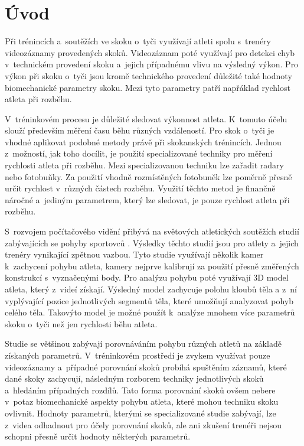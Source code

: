 \chapter*{Úvod}

Při trénincích a~soutěžích ve skoku o~tyči využívají atleti spolu s~trenéry videozáznamy provedených skoků. Videozáznam poté využívají pro detekci chyb v~technickém provedení skoku a~jejich případnému vlivu na výsledný výkon. Pro výkon při skoku o~tyči jsou kromě technického provedení důležité také hodnoty biomechanické parametry skoku. Mezi tyto parametry patří napřáklad rychlost atleta při rozběhu.

V~tréninkovém procesu je důležité sledovat výkonnost atleta. K~tomuto účelu slouží především měření času běhu různých vzdáleností. Pro skok o~tyči je vhodné aplikovat podobné metody právě při skokanských trénincích. Jednou z~možností, jak toho docílit, je použití specializované techniky pro měření rychlosti atleta při rozběhu. Mezi specializovanou techniku lze zařadit radary nebo fotobuňky. Za použití vhodně rozmístěných fotobuněk lze poměrně přesně určit rychlost v~různých částech rozběhu. Využití těchto metod je finančně náročné a~jediným parametrem, který lze sledovat, je pouze rychlost atleta při rozběhu.

S~rozvojem počítačového vidění přibývá na světových atletických soutěžích studií zabývajících se pohyby sportovců \citep{IAAFBR}. Výsledky těchto studií jsou pro atlety a~jejich trenéry vynikající zpětnou vazbou. Tyto studie využívají několik kamer k~zachycení pohybu atleta, kamery nejprve kalibrují za použití přesně změřených konstrukcí s~vyznačenými body. Pro analýzu pohybu poté využívají 3D model atleta, který z~videí získají. Výsledný model zachycuje polohu kloubů těla a z~ní vyplývající pozice jednotlivých segmentů těla, které umožňují analyzovat pohyb celého těla. Takovýto model je možné použít k~analýze mnohem více parametrů skoku o~tyči než jen rychlosti běhu atleta.

Studie se většinou zabývají porovnáváním pohybu různých atletů na základě získaných parametrů. V~tréninkovém prostředí je zvykem využívat pouze videozáznamy a~případné porovnání skoků probíhá spuštěním záznamů, které dané skoky zachycují, následným rozborem techniky jednotlivých skoků a~hledáním případných rozdílů. Tato forma porovnání skoků ovšem nebere v~potaz biomechanické aspekty pohybu atleta, které mohou techniku skoku ovlivnit. Hodnoty parametrů, kterými se specializované studie zabývají, lze z~videa odhadnout pro účely porovnání skoků, ale ani zkušení trenéři nejsou schopni přesně určit hodnoty některých parametrů.

